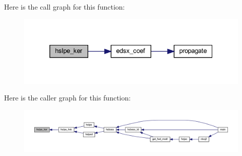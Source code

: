 Here is the call graph for this function\+:\nopagebreak
\begin{figure}[H]
\begin{center}
\leavevmode
\includegraphics[width=332pt]{Leroi_8f90_ae58b6750741316da9a6a86b44785fa58_cgraph}
\end{center}
\end{figure}
Here is the caller graph for this function\+:\nopagebreak
\begin{figure}[H]
\begin{center}
\leavevmode
\includegraphics[width=350pt]{Leroi_8f90_ae58b6750741316da9a6a86b44785fa58_icgraph}
\end{center}
\end{figure}
\mbox{\label{Leroi_8f90_a1965f18ad74a78ddcda474fa4268445f}} 
